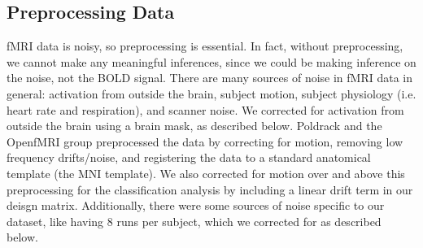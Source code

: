 \documentclass[11pt]{article}
\begin{document}
\subsection{Preprocessing Data}             
fMRI data is noisy, so preprocessing is essential.  In fact, without preprocessing, 
we cannot make any meaningful inferences, since we could be making inference on 
the noise, not the BOLD signal.  There are many sources of noise in fMRI data in general:
activation from outside the brain, subject motion, subject physiology (i.e. heart 
rate and respiration), and scanner noise.  We corrected for activation from outside the brain using a brain mask, as described below.  Poldrack and the OpenfMRI group 
preprocessed the data by correcting for motion, removing low frequency drifts/noise, and registering the data to a standard anatomical template (the MNI template).  We 
also corrected for motion over and above this preprocessing for the classification
analysis by including a linear drift term in our deisgn matrix.
Additionally, there were some sources of noise specific to our dataset, like
having 8 runs per subject, which we corrected for as described below.
\end{document}
